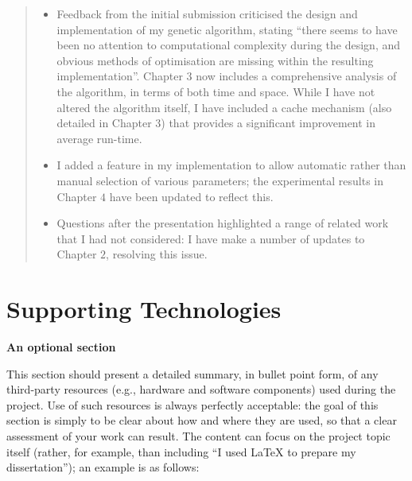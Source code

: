 \documentclass[oneside,%
                    author={Malak Hajji},
                    degree={BSc},
                    title={Designing An Accessible Computational Toolkit For Students},
                  subtitle={With Mixed Visual Abilities}]{dissertation}
\begin{document}
\begin{quote}
\noindent
\begin{itemize}
\item Feedback from the initial submission criticised the design and 
      implementation of my genetic algorithm, stating ``there seems 
      to have been no attention to computational complexity during the
      design, and obvious methods of optimisation are missing within
      the resulting implementation''.  Chapter $3$ now includes a
      comprehensive analysis of the algorithm, in terms of both time
      and space.  While I have not altered the algorithm itself, I
      have included a cache mechanism (also detailed in Chapter $3$)
      that provides a significant improvement in average run-time.
\item I added a feature in my implementation to allow automatic rather
      than manual selection of various parameters; the experimental
      results in Chapter $4$ have been updated to reflect this.
\item Questions after the presentation highlighted a range of related
      work that I had not considered: I have make a number of updates 
      to Chapter $2$, resolving this issue.
\end{itemize}
\end{quote}


\chapter*{Supporting Technologies}

{\bf An optional section}
\vspace{1cm} 

\noindent
This section should present a detailed summary, in bullet point form, 
of any third-party resources (e.g., hardware and software components) 
used during the project.  Use of such resources is always perfectly 
acceptable: the goal of this section is simply to be clear about how
and where they are used, so that a clear assessment of your work can
result.  The content can focus on the project topic itself (rather,
for example, than including ``I used \mbox{\LaTeX} to prepare my 
dissertation''); an example is as follows:
\end{document}
